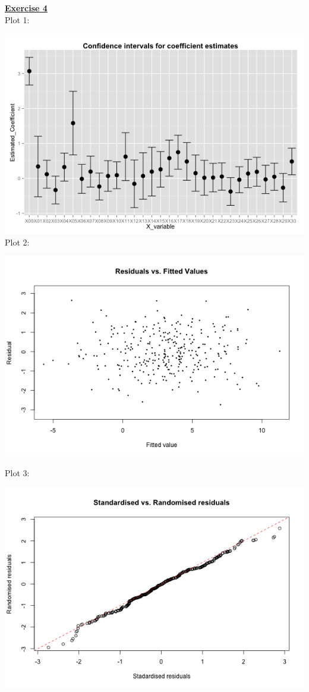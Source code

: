 \documentclass[a4paper, 11pt]{article}
\begin{document}
\newpage
\textbf{\underline{Exercise 4}}\\
\newline Plot 1:\\
\begin{center}
\end{center}
\includegraphics[scale=0.7]{ps1_plot1.png}
\newline Plot 2:\\
\begin{center}
\includegraphics[scale=0.7]{ps1_plot2.png}
\end{center}
Plot 3:\\
\begin{center}
\includegraphics[scale=0.7]{ps1_plot3.png}
\end{center}
\end{document}
